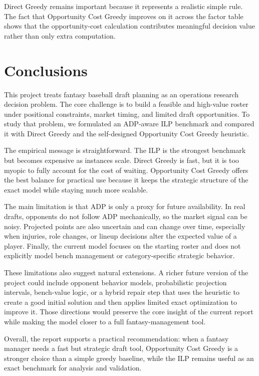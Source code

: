 \documentclass[10pt,a4paper]{article}
\begin{document}
Direct Greedy remains important because it represents a realistic simple rule. The fact that Opportunity Cost Greedy improves on it across the factor table shows that the opportunity-cost calculation contributes meaningful decision value rather than only extra computation.

\section{Conclusions}

This project treats fantasy baseball draft planning as an operations research decision problem. The core challenge is to build a feasible and high-value roster under positional constraints, market timing, and limited draft opportunities. To study that problem, we formulated an ADP-aware ILP benchmark and compared it with Direct Greedy and the self-designed Opportunity Cost Greedy heuristic.

The empirical message is straightforward. The ILP is the strongest benchmark but becomes expensive as instances scale. Direct Greedy is fast, but it is too myopic to fully account for the cost of waiting. Opportunity Cost Greedy offers the best balance for practical use because it keeps the strategic structure of the exact model while staying much more scalable.

The main limitation is that ADP is only a proxy for future availability. In real drafts, opponents do not follow ADP mechanically, so the market signal can be noisy. Projected points are also uncertain and can change over time, especially when injuries, role changes, or lineup decisions alter the expected value of a player. Finally, the current model focuses on the starting roster and does not explicitly model bench management or category-specific strategic behavior.

These limitations also suggest natural extensions. A richer future version of the project could include opponent behavior models, probabilistic projection intervals, bench-value logic, or a hybrid repair step that uses the heuristic to create a good initial solution and then applies limited exact optimization to improve it. Those directions would preserve the core insight of the current report while making the model closer to a full fantasy-management tool.

Overall, the report supports a practical recommendation: when a fantasy manager needs a fast but strategic draft tool, Opportunity Cost Greedy is a stronger choice than a simple greedy baseline, while the ILP remains useful as an exact benchmark for analysis and validation.
\end{document}
